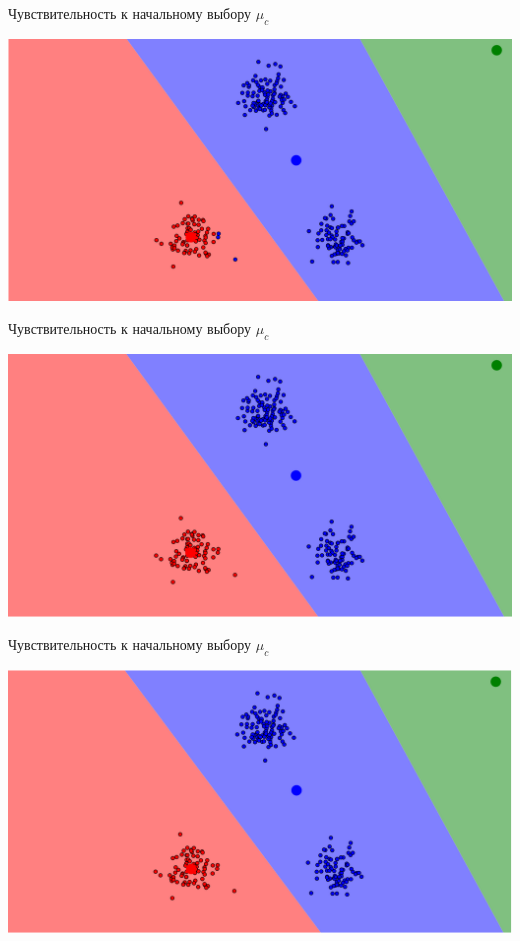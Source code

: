 \documentclass[10pt]{beamer}
\begin{document}
\begin{frame}{Чувствительность к начальному выбору $\mu_c$}
	\begin{center}
	  \includegraphics[width= \textwidth, keepaspectratio = true]{images/localmin2}  
	\end{center}
\end{frame}

\begin{frame}{Чувствительность к начальному выбору $\mu_c$}
	\begin{center}
	  \includegraphics[width= \textwidth, keepaspectratio = true]{images/localmin3}  
	\end{center}
\end{frame}

\begin{frame}{Чувствительность к начальному выбору $\mu_c$}
	\begin{center}
	  \includegraphics[width= \textwidth, keepaspectratio = true]{images/localmin4}  
	\end{center}
\end{frame}
\end{document}

